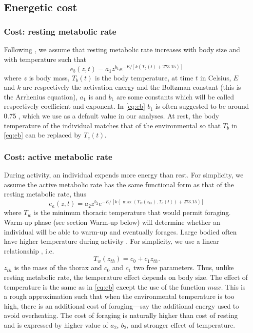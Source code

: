\subsection*{Energetic cost}
\subsubsection*{Cost: resting metabolic rate}
Following \citet{Brown2004}, we assume that resting metabolic rate increases with body size and with temperature such that
\begin{equation} \label{eq:eb}
	e_b(z, t) = a_1 z^{b_1} e^{-E/[k (T_b(t)+ 273.15)]}
\end{equation}
where $z$ is body mass, $T_b(t)$ is the body temperature, at time $t$ in Celsius, $E$ and $k$ are respectively the activation energy and the Boltzman constant (this is the Arrhenius equation), $a_1$ is and $b_1$ are some constants which will be called respectively coefficient and exponent.
In \cref{eq:eb} $b_1$ is often suggested to be around 0.75 \citep{Kleiber1947, Peters1986, Brown2004}, which we use as a default value in our analyses.
At rest, the body temperature of the individual matches that of the environmental \citep[e.g.,][]{Bartholomew1978} so that $T_b$ in \cref{eq:eb} can be replaced by $T_e(t)$.

\subsubsection*{Cost: active metabolic rate}
During activity, an individual expends more energy than rest. 
For simplicity, we assume the active metabolic rate has the same functional form as that of the resting metabolic rate, thus
\begin{equation} \label{eq:ea}
	e_a(z,t) = a_2 z^{b_2}  e^{-E/[k (\max(T_w(z_{th}), T_e(t))+ 273.15)]}
\end{equation}
where $T_w$ is the minimum thoracic temperature that would permit foraging.
Warm-up phase (see section Warm-up below) will determine whether an individual will be able to warm-up and eventually forages.
Large bodied often have higher temperature during activity \citep{Bartholomew1977a}.
For simplicity, we use a linear relationship \citep{Bartholomew1977a}, i.e.
\begin{equation} \label{eq:Tw}
	T_w(z_{th}) = c_0+ c_1 z_{th}.
\end{equation}
$z_{th}$ is the mass of the thorax and $c_0$ and $c_1$ two free parameters.
Thus, unlike resting metabolic rate, the temperature effect depends on body size.
The effect of temperature is the same as in \cref{eq:eb} except the use of the function $max$.
This is a rough approximation such that when the environmental temperature is too high, there is an additional cost of foraging---say the additional energy used to avoid overheating. 
The cost of foraging is naturally higher than cost of resting and is expressed by higher value of $a_2$, $b_2$, and stronger effect of temperature.

